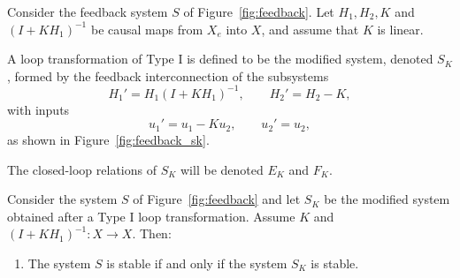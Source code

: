 \begin{definition}
Consider the feedback system $S$ of Figure~\ref{fig:feedback}.  
Let $H_1, H_2, K$ and $(I+KH_1)^{-1}$ be causal maps from $X_e$ into $X$, and assume that $K$ is linear.  

A loop transformation of Type I is defined to be the modified system, denoted $S_K$, formed by the feedback interconnection of the subsystems
\begin{equation}
H_1' = H_1 (I+KH_1)^{-1}, \qquad H_2' = H_2 - K,
\end{equation}
with inputs
\begin{equation}
u_1' = u_1 - Ku_2, \qquad u_2' = u_2,
\end{equation}
as shown in Figure~\ref{fig:feedback_sk}.  

The closed-loop relations of $S_K$ will be denoted $E_K$ and $F_K$.
\end{definition}

\begin{theorem}
Consider the system $S$ of Figure~\ref{fig:feedback} and let $S_K$ be the modified system obtained after a Type I loop transformation. Assume $K$ and $(I+KH_1)^{-1}: X \to X$. Then:
\begin{enumerate}
    \item The system $S$ is stable if and only if the system $S_K$ is stable.
\end{enumerate}
\end{theorem}

